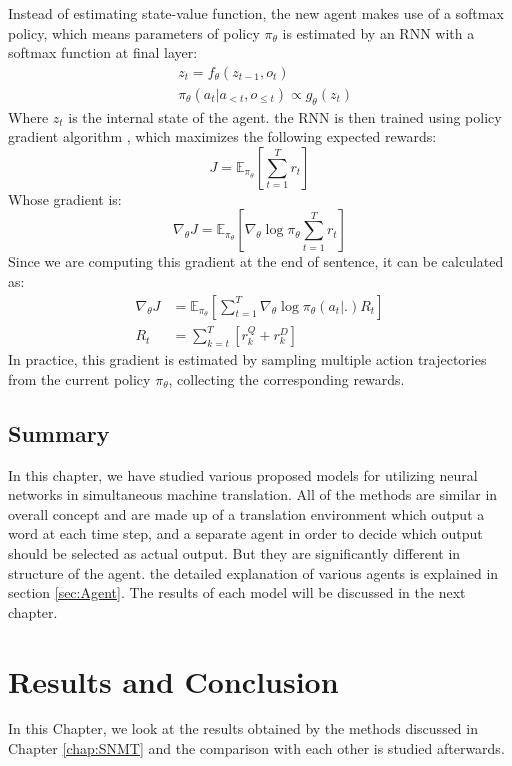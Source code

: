 \documentclass{sfuthesis}
\begin{document}
Instead of estimating state-value function, the new agent makes use of a softmax policy, which means parameters of policy $\pi_\theta$ is estimated by an RNN with a softmax function at final layer:
\begin{align*}
        &z_t = f_\theta (z_{t-1}, o_t) \\
        &\pi_\theta (a_t | a_{<t}, o_{\leq t}) \propto g_\theta(z_t)
\end{align*}
Where $z_t$ is the internal state of the agent. the RNN is then trained using policy gradient algorithm \cite{Williams:1992:ML}, which maximizes the following expected rewards:
$$J = \mathbb{E}_{\pi_\theta} \left[\sum_{t=1}^{T} r_t \right]$$
Whose gradient is:
$$\nabla_\theta J = \mathbb{E}_{\pi_\theta} \left[ \nabla_\theta \log 
    \pi_\theta \sum_{t=1}^{T} r_t \right]$$
Since we are computing this gradient at the end of sentence, it can be calculated as:
\begin{align*}
        \nabla_\theta J &= \mathbb{E}_{\pi_\theta} \left[ \sum_{t=1}^{T} \nabla_\theta \log \pi_\theta ( a_t | .) R_t \right] \\[10pt]
        R_t &= \sum_{k=t}^{T} \left[ r_k^Q + r_k^D \right]
\end{align*}
In practice, this gradient is estimated by sampling multiple action trajectories from the current policy $\pi_\theta$, collecting the corresponding rewards.\\

\section{Summary}
In this chapter, we have studied various proposed models for utilizing neural networks in simultaneous machine translation. All of the methods are similar in overall concept and are made up of a translation environment which output a word at each time step, and a separate agent in order to decide which output should be selected as actual output. But they are significantly different in structure of the agent. the detailed explanation of various agents is explained in section \ref{sec:Agent}. The results of each model will be discussed in the next chapter.

\chapter{Results and Conclusion} \label{chap:results}
In this Chapter, we look at the results obtained by the methods discussed in Chapter \ref{chap:SNMT} and the comparison with each other is studied afterwards.
\end{document}
